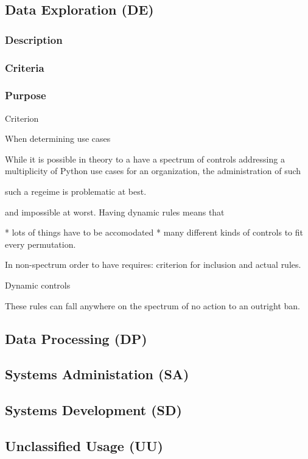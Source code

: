 	\subsection{Data Exploration (DE)}

		\subsubsection{Description}

			

		\subsubsection{Criteria}
		\subsubsection{Purpose}



Criterion

		When determining use cases

		While it is possible in theory to a have a spectrum of controls addressing a multiplicity of Python use cases for an organization, the administration of such

		such a regeime is problematic at best.

		 and impossible at worst. Having dynamic rules means that

		* lots of things have to be accomodated
		* many different kinds of controls to fit every permutation.

		In non-spectrum order to have
			requires: criterion for inclusion and actual rules.

		Dynamic controls


		These rules can fall anywhere on the spectrum of no action to an outright ban.


	\subsection{Data Processing (DP)}

	\subsection{Systems Administation (SA)}

	\subsection{Systems Development (SD)}

	\subsection{Unclassified Usage (UU)}